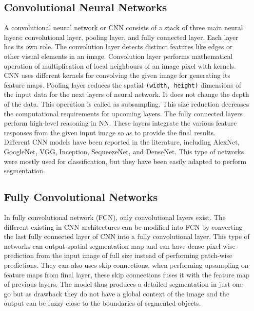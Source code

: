\subsection{Convolutional Neural Networks}
A convolutional neural network or CNN consists of a stack of
three main neural layers: convolutional layer, pooling layer, and fully
connected layer. Each layer has its own role. The convolution layer
detects distinct features like edges or other visual elements in an image.
Convolution layer performs mathematical operation of multiplication of local
neighbours of an image pixel with kernels. CNN uses different kernels for
convolving the given image for generating its feature maps. Pooling layer
reduces the spatial \texttt{(width, height)} dimensions of the input data for the next
layers of neural network. It does not change the depth of the data. This
operation is called as subsampling. This size reduction decreases the
computational requirements for upcoming layers. The fully connected layers
perform high-level reasoning in NN. These layers integrate the various feature
responses from the given input image so as to provide the final results.\\
Different CNN models have been reported in the literature, including AlexNet,
GoogleNet, VGG, Inception, SequeezeNet, and DenseNet. This type of networks were
mostly used for classification, but they have been easily adapted to perform
segmentation.

\subsection{Fully Convolutional Networks}
In fully convolutional network (FCN), only convolutional layers exist. The
different existing in CNN architectures can be modified into FCN by converting
the last fully connected layer of CNN into a fully convolutional layer. This
type of networks can output spatial segmentation map and can have dense
pixel-wise prediction from the input image of full size instead of performing
patch-wise predictions. They can also uses skip connections, when performing upsampling
on feature maps from final layer, these skip connections fuses it with the
feature map of previous layers. The model thus produces a detailed segmentation
in just one go but as drawback they do not have a global context of the image
and the output can be fuzzy close to the boundaries of segmented objects.

